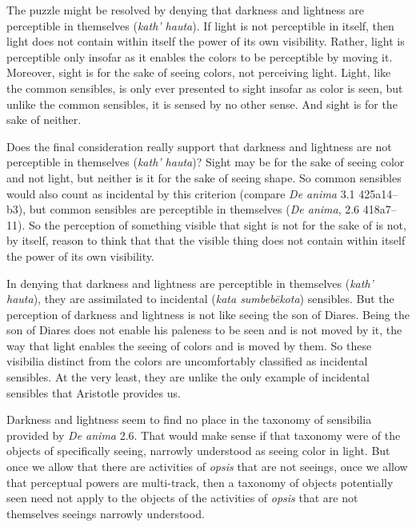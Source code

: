 The puzzle might be resolved by denying that darkness and lightness are perceptible in themselves (\emph{kath' hauta}). If light is not perceptible in itself, then light does not contain within itself the power of its own visibility. Rather, light is perceptible only insofar as it enables the colors to be perceptible by moving it. Moreover, sight is for the sake of seeing colors, not perceiving light. Light, like the common sensibles, is only ever presented to sight insofar as color is seen, but unlike the common sensibles, it is sensed by no other sense. And sight is for the sake of neither.

Does the final consideration really support that darkness and lightness are not perceptible in themselves (\emph{kath' hauta})? Sight may be for the sake of seeing color and not light, but neither is it for the sake of seeing shape. So common sensibles would also count as incidental by this criterion (compare \emph{De anima} 3.1 425a14–b3), but common sensibles are perceptible in themselves (\emph{De anima}, 2.6 418a7–11). So the perception of something visible that sight is not for the sake of is not, by itself, reason to think that that the visible thing does not contain within itself the power of its own visibility.

In denying that darkness and lightness are perceptible in themselves (\emph{kath' hauta}), they are assimilated to incidental (\emph{kata sumbebēkota}) sensibles. But the perception of darkness and lightness is not like seeing the son of Diares. Being the son of Diares does not enable his paleness to be seen and is not moved by it, the way that light enables the seeing of colors and is moved by them. So these visibilia distinct from the colors are uncomfortably classified as incidental sensibles. At the very least, they are unlike the only example of incidental sensibles that Aristotle provides us.

Darkness and lightness seem to find no place in the taxonomy of sensibilia provided by \emph{De anima} 2.6. That would make sense if that taxonomy were of the objects of specifically seeing, narrowly understood as seeing color in light. But once we allow that there are activities of \emph{opsis} that are not seeings, once we allow that perceptual powers are multi-track, then a taxonomy of objects potentially seen need not apply to the objects of the activities of \emph{opsis} that are not themselves seeings narrowly understood.

